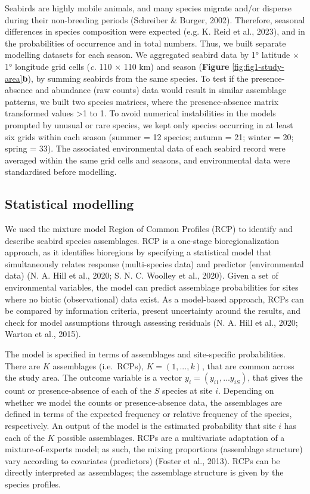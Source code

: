 \documentclass{article}
\begin{document}
\begin{linenumbers}
Seabirds are highly mobile animals, and many species migrate and/or disperse during their non-breeding periods (Schreiber \& Burger, 2002). Therefore, seasonal differences in species composition were expected (e.g. K. Reid et al., 2023), and in the probabilities of occurrence and in total numbers. Thus, we built separate modelling datasets for each season. We aggregated seabird data by 1° latitude \(\times\) 1° longitude grid cells (\emph{c.} 110 \(\times\) 110 km) and season (\textbf{Figure} \ref{fig:fig1-study-area}\textbf{b}), by summing seabirds from the same species. To test if the presence-absence and abundance (raw counts) data would result in similar assemblage patterns, we built two species matrices, where the presence-absence matrix transformed values \textgreater1 to 1. To avoid numerical instabilities in the models prompted by unusual or rare species, we kept only species occurring in at least six grids within each season (summer = 12 species; autumn = 21; winter = 20; spring = 33). The associated environmental data of each seabird record were averaged within the same grid cells and seasons, and environmental data were standardised before modelling.

\hypertarget{statistical-modelling}{%
\subsection{Statistical modelling}\label{statistical-modelling}}

We used the mixture model Region of Common Profiles (RCP) to identify and describe seabird species assemblages. RCP is a one-stage bioregionalization approach, as it identifies bioregions by specifying a statistical model that simultaneously relates response (multi-species data) and predictor (environmental data) (N. A. Hill et al., 2020; S. N. C. Woolley et al., 2020). Given a set of environmental variables, the model can predict assemblage probabilities for sites where no biotic (observational) data exist. As a model-based approach, RCPs can be compared by information criteria, present uncertainty around the results, and check for model assumptions through assessing residuals (N. A. Hill et al., 2020; Warton et al., 2015).

The model is specified in terms of assemblages and site-specific probabilities. There are \(K\) assemblages (i.e.~RCPs), \(K = (1, ..., k)\), that are common across the study area. The outcome variable is a vector \(y_{i} = (y_{i1}, ... y_{iS})\), that gives the count or presence-absence of each of the \(S\) species at site \(i\). Depending on whether we model the counts or presence-absence data, the assemblages are defined in terms of the expected frequency or relative frequency of the species, respectively. An output of the model is the estimated probability that site \(i\) has each of the \(K\) possible assemblages. RCPs are a multivariate adaptation of a mixture-of-experts model; as such, the mixing proportions (assemblage structure) vary according to covariates (predictors) (Foster et al., 2013). RCPs can be directly interpreted as assemblages; the assemblage structure is given by the species profiles.


\end{linenumbers}
\end{document}

